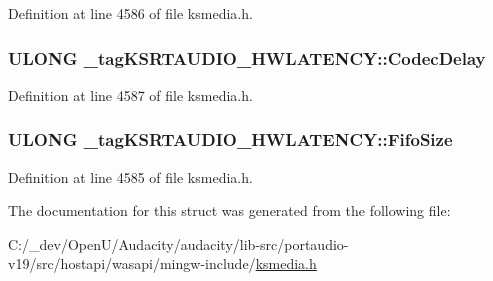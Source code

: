Definition at line 4586 of file ksmedia.\+h.

\subsubsection[{\texorpdfstring{Codec\+Delay}{CodecDelay}}]{\setlength{\rightskip}{0pt plus 5cm}U\+L\+O\+NG \+\_\+tag\+K\+S\+R\+T\+A\+U\+D\+I\+O\+\_\+\+H\+W\+L\+A\+T\+E\+N\+C\+Y\+::\+Codec\+Delay}\hypertarget{struct__tag_k_s_r_t_a_u_d_i_o___h_w_l_a_t_e_n_c_y_ab3fb71ad1e0dbf27f01505cabbd16ad3}{}\label{struct__tag_k_s_r_t_a_u_d_i_o___h_w_l_a_t_e_n_c_y_ab3fb71ad1e0dbf27f01505cabbd16ad3}


Definition at line 4587 of file ksmedia.\+h.

\subsubsection[{\texorpdfstring{Fifo\+Size}{FifoSize}}]{\setlength{\rightskip}{0pt plus 5cm}U\+L\+O\+NG \+\_\+tag\+K\+S\+R\+T\+A\+U\+D\+I\+O\+\_\+\+H\+W\+L\+A\+T\+E\+N\+C\+Y\+::\+Fifo\+Size}\hypertarget{struct__tag_k_s_r_t_a_u_d_i_o___h_w_l_a_t_e_n_c_y_a1270423fb3d0b206b98c0514bbfaa01b}{}\label{struct__tag_k_s_r_t_a_u_d_i_o___h_w_l_a_t_e_n_c_y_a1270423fb3d0b206b98c0514bbfaa01b}


Definition at line 4585 of file ksmedia.\+h.



The documentation for this struct was generated from the following file\+:\begin{DoxyCompactItemize}
\item 
C\+:/\+\_\+dev/\+Open\+U/\+Audacity/audacity/lib-\/src/portaudio-\/v19/src/hostapi/wasapi/mingw-\/include/\hyperlink{ksmedia_8h}{ksmedia.\+h}\end{DoxyCompactItemize}
